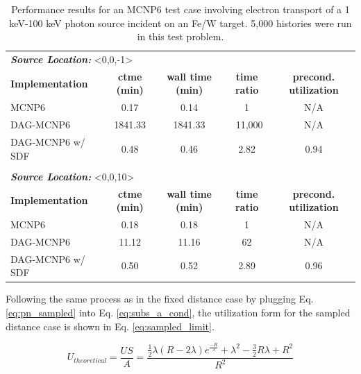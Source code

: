 \begin{table}[!h]
  \centering
  \begin{tabular}{lcccc}
          \multicolumn{5}{l}{\textbf{\textit{Source Location:}} <0,0,-1>} \\
          \textbf{Implementation} & \textbf{ctme (min)} & \textbf{wall time
            (min)} & \textbf{time ratio} & \textbf{precond. utilization}\\
          \hline
          MCNP6 & 0.17 & 0.14 & 1 & N/A \\
          DAG-MCNP6 & 1841.33 & 1841.33 & ~11,000 & N/A \\
          DAG-MCNP6 w/ SDF & 0.48 & 0.46 & 2.82 & 0.94\\
          \multicolumn{5}{l}{} \\
          \multicolumn{5}{l}{\textbf{\textit{Source Location:}} <0,0,10>} \\
          \textbf{Implementation} & \textbf{ctme (min)} & \textbf{wall time
            (min)} & \textbf{time ratio} & \textbf{precond. utilization}\\
          \hline
          MCNP6 & 0.18 & 0.18 & 1 & N/A \\
          DAG-MCNP6 & 11.12 & 11.16 & 62 & N/A \\
          DAG-MCNP6 w/ SDF & 0.50 & 0.52 & 2.89 & 0.96 \\
          
  \end{tabular}
  \caption{Performance results for an MCNP6 test case involving electron
    transport of a 1 keV-100 keV photon source incident on an Fe/W target. 5,000
    histories were run in this test problem.}
  \label{tab:inp066_results}
\end{table}

Following the same process as in the fixed distance case by plugging Eq. \ref{eq:pn_sampled} into
Eq. \ref{eq:subs_a_cond}, the utilization form for the sampled distance case is
shown in Eq. \ref{eq:sampled_limit}.

\begin{equation}
  \label{eq:sampled_limit}
  U_{theoretical} = \frac{US}{A} = \frac{ \frac{1}{2} \lambda(R - 2 \lambda) e^{\frac{-R}{\lambda}} + \lambda^2 - \frac{3}{2} R \lambda + R^2 }{R^2}
\end{equation}

